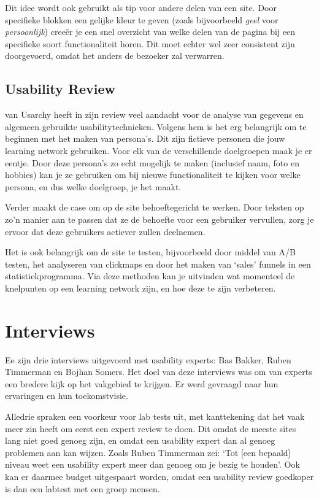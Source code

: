 \documentclass[a4paper, 10pt, pdftex]{report}
\begin{document}
    Dit idee wordt ook gebruikt als tip voor andere delen van een site. Door specifieke blokken een gelijke kleur te geven (zoals bijvoorbeeld \emph{geel} voor \emph{persoonlijk}) cree\"er je een snel overzicht van welke delen van de pagina bij een specifieke soort functionaliteit horen. Dit moet echter wel zeer consistent zijn doorgevoerd, omdat het anders de bezoeker zal verwarren.

    \subsection{Usability Review \citet{Timmerman2008}}
    \citeauthor{Timmerman2008} van Usarchy heeft in zijn review veel aandacht voor de analyse van gegevens en algemeen gebruikte usabilitytechnieken. Volgens hem is het erg belangrijk om te beginnen met het maken van persona's. Dit zijn fictieve personen die jouw learning network gebruiken. Voor elk van de verschillende doelgroepen maak je er eentje. Door deze persona's zo echt mogelijk te maken (inclusief naam, foto en hobbies) kan je ze gebruiken om bij nieuwe functionaliteit te kijken voor welke persona, en dus welke doelgroep, je het maakt.

    Verder maakt \citeauthor{Timmerman2008} de case om op de site behoeftegericht te werken. Door teksten op zo'n manier aan te passen dat ze de behoefte voor een gebruiker vervullen, zorg je ervoor dat deze gebruikers actiever zullen deelnemen.

    Het is ook belangrijk om de site te testen, bijvoorbeeld door middel van A/B testen, het analyseren van clickmaps en door het maken van `sales' funnels in een statistiekprogramma. Via deze methoden kan je uitvinden wat momenteel de knelpunten op een learning network zijn, en hoe deze te zijn verbeteren.

  \section{Interviews}
    Ee zijn drie interviews uitgevoerd met usability experts: Bas Bakker, Ruben Timmerman en Bojhan Somers. Het doel van deze interviews was om van experts een bredere kijk op het vakgebied te krijgen. Er werd gevraagd naar hun ervaringen en hun toekomstvisie.

    Alledrie spraken een voorkeur voor lab tests uit, met kanttekening dat het vaak meer zin heeft om eerst een expert review te doen. Dit omdat de meeste sites lang niet goed genoeg zijn, en omdat een usability expert dan al genoeg problemen aan kan wijzen. Zoals Ruben Timmerman zei: `Tot [een bepaald] niveau weet een usability expert meer dan genoeg om je bezig te houden'. Ook kan er daarmee budget uitgespaart worden, omdat een usability review goedkoper is dan een labtest met een groep mensen.
\end{document}
